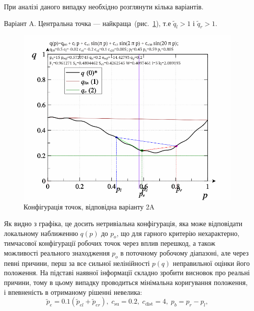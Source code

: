 При аналізі даного випадку необхідно розглянути кілька
варіантів.

Варіант A.\label{atu:d:p_eql_2A} %
%
Центральна точка --- найкраща~(рис.~\ref{atu:f:pq_2A}),
т.е $\tilde{q}_l > 1 $ і $\tilde{q}_r > 1  $.

\begin{figure}[htb!]
  \begin{center}
    \includegraphics[width=60\TW]{p/pq_sin-p_pq_cgood.png}
  \end{center}
  \caption{Конфігурація точок, відповідна варіанту 2A}
  \label{atu:f:pq_2A}
\end{figure}

Як видно з графіка, це досить нетривіальна конфігурація, яка
може відповідати локальному наближенню
$ q (p) $ до
$ p_o $, що для гарного критерію нехарактерно, тимчасової
конфігурації робочих точок через вплив перешкод, а також
можливості реального знаходження
$ p_o $ в поточному робочому діапазоні, але через певні причини,
перш за все сильної нелінійності
$p(q)$ неправильної оцінки його положення. На підставі наявної
інформації складно зробити висновок про реальні причини, тому
в цьому випадку проводиться мінімальна коригування положення,
і впевненість в отриманому рішенні невелика:
%
\begin{equation}
  \tilde{p}_e = 0.1 ( \tilde{p}_{el} + \tilde{p}_{er} ),
  \;
  c_\mathrm{su} = 0.2, \;  c_\mathrm{dist} = 4, \;   p_b = p_r - p_l,
  \label{atu:eq:pr_e_2A}
\end{equation}



